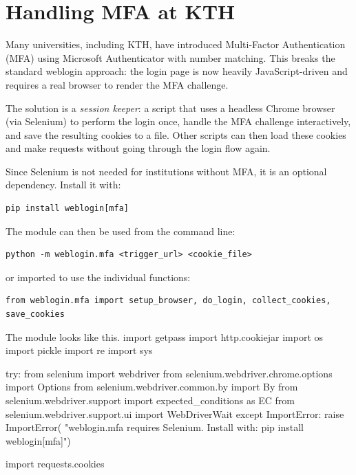 \section{Handling MFA at KTH}\label{MFAsessionkeeper}%

Many universities, including KTH, have introduced Multi-Factor
Authentication (MFA) using Microsoft Authenticator with number matching.
This breaks the standard {\Tt{}weblogin\nwendquote} approach: the login page is now
heavily JavaScript-driven and requires a real browser to render the MFA
challenge.

The solution is a \emph{session keeper}: a script that uses a headless
Chrome browser (via Selenium) to perform the login once, handle the MFA
challenge interactively, and save the resulting cookies to a file.
Other scripts can then load these cookies and make requests without
going through the login flow again.

Since Selenium is not needed for institutions without MFA, it is an
optional dependency.
Install it with:
\begin{verbatim}
pip install weblogin[mfa]
\end{verbatim}
The module can then be used from the command line:
\begin{verbatim}
python -m weblogin.mfa <trigger_url> <cookie_file>
\end{verbatim}
or imported to use the individual functions:
\begin{verbatim}
from weblogin.mfa import setup_browser, do_login, collect_cookies, save_cookies
\end{verbatim}

The module looks like this.
\endmoddef\nwstartdeflinemarkup\nwenddeflinemarkup
import getpass
import http.cookiejar
import os
import pickle
import re
import sys

try:
  from selenium import webdriver
  from selenium.webdriver.chrome.options import Options
  from selenium.webdriver.common.by import By
  from selenium.webdriver.support import expected_conditions as EC
  from selenium.webdriver.support.ui import WebDriverWait
except ImportError:
  raise ImportError(
    "weblogin.mfa requires Selenium. Install with: pip install weblogin[mfa]")

import requests.cookies

